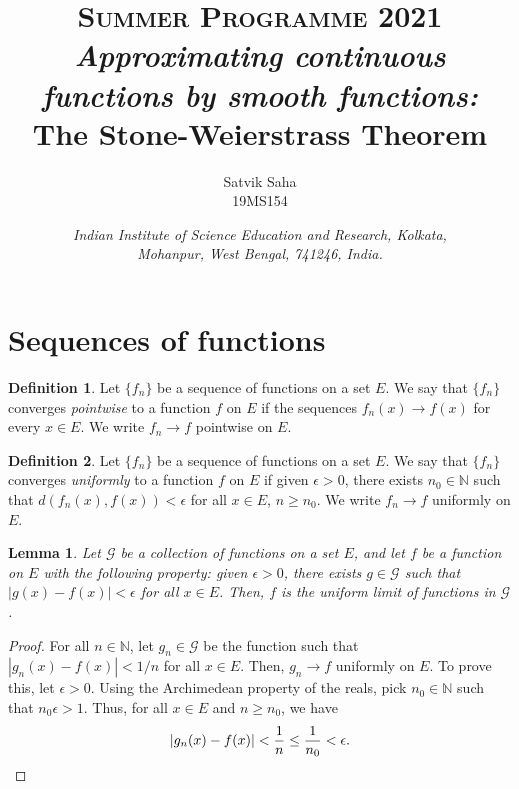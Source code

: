 \documentclass[11pt]{article}
\title{
    \Large\textsc{Summer Programme 2021} \\
    \vspace{10pt}
    \textit{\Large Approximating continuous functions by smooth functions:} \\
    \vspace{6pt}
    {\huge\bf The Stone-Weierstrass Theorem}
}
\author{
    \large Satvik Saha%
    \\\textsc{\small 19MS154}
}
\date{\normalsize
    \textit{Indian Institute of Science Education and Research, Kolkata, \\
    Mohanpur, West Bengal, 741246, India.} \\
}
\def\N{\mathbb{N}}
\newtheorem{lemma}[theorem]{Lemma}
\theoremstyle{definition}
\newtheorem{definition}{Definition}[section]
\theoremstyle{remark}
\begin{document}
    \maketitle

    \section{Sequences of functions}
    \begin{definition}
        Let $\{f_n\}$ be a sequence of functions on a set $E$. We say that
        $\{f_n\}$ converges \textit{pointwise} to a function $f$ on $E$ if the
        sequences $f_n(x) \to f(x)$ for every $x \in E$. We write $f_n \to f$
        pointwise on $E$.
    \end{definition}

    \begin{definition}
        Let $\{f_n\}$ be a sequence of functions on a set $E$. We say that
        $\{f_n\}$ converges \textit{uniformly} to a function $f$ on $E$ if given
        $\epsilon > 0$, there exists $n_0 \in \N$ such that $d(f_n(x), f(x)) <
        \epsilon$ for all $x \in E$, $n \geq n_0$.  We write $f_n \to
        f$ uniformly on $E$.
    \end{definition}

    \begin{lemma}
        Let $\mathscr{G}$ be a collection of functions on a set $E$, and let
        $f$ be a function on $E$ with the following property: given $\epsilon >
        0$, there exists $g \in \mathscr{G}$ such that $|g(x) - f(x)| <
        \epsilon$ for all $x \in E$. Then, $f$ is the uniform limit of functions in
        $\mathscr{G}$.
    \end{lemma}
    \begin{proof}
        For all $n \in \N$, let $g_n \in \mathscr{G}$ be the function such that
        $|g_n(x) - f(x)| < 1 / n$ for all $x \in E$.  Then, $g_n \to f$ uniformly on
        $E$. To prove this, let $\epsilon > 0$. Using the Archimedean property of the
        reals, pick $n_0 \in \N$ such that $n_0\epsilon > 1$. Thus, for all $x \in E$
        and $n \geq n_0$, we have \[
            |g_n(x) - f(x)| < \frac{1}{n} \leq \frac{1}{n_0} < \epsilon. \qedhere
        \] 
    \end{proof}
\end{document}
